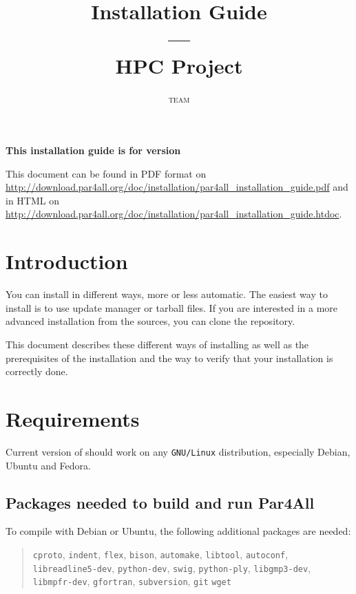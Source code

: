 \documentclass[a4paper]{article}
\newcommand{\LINK}[1]{\url{#1}\xspace}
\newcommand{\PfaInstallationPDF}{\LINK{http://download.par4all.org/doc/installation/par4all_installation_guide.pdf}}
\newcommand{\PfaAllInstallationHTDOC}{\LINK{http://download.par4all.org/doc/installation/par4all_installation_guide.htdoc}}
\begin{document}
\title{\protect\Apfa Installation Guide\\
  ---\\
  HPC Project}

\author{\Apfa \textsc{team}}

\maketitle

\noindent\textbf{This installation guide is for \Apfa version }
\bigskip

This document can be found in PDF format on \PfaInstallationPDF and in HTML
on \PfaAllInstallationHTDOC.


\section{Introduction}
\label{sec:introduction}


You can install \Apfa in different ways, more or less automatic. The easiest
way to install \Apfa is to use update manager or tarball files. If you are
interested in a more advanced installation from the sources, you can clone 
the \Apfa \Agit repository.

This document describes these different ways of installing \Apfa as well as 
the prerequisites of the installation and the way to verify that your installation
is correctly done.

\section{Requirements}
\label{sec:requirements}

Current version of \Apfa should work on any \texttt{GNU/Linux} distribution, especially Debian, 
Ubuntu and Fedora.

\subsection{Packages needed to build and run Par4All}
\label{sec:pack-need-build}


To compile \Apfa with Debian or Ubuntu, the following additional
packages are needed:
\begin{quote}
  \texttt{cproto}, \texttt{indent}, \texttt{flex}, \texttt{bison},
  \texttt{automake}, \texttt{libtool}, \texttt{autoconf},
  \texttt{libreadline5-dev}, \texttt{python-dev}, \texttt{swig},
  \texttt{python-ply}, \texttt{libgmp3-dev},
  \texttt{libmpfr-dev}, \texttt{gfortran}, \texttt{subversion},
  \texttt{git} \texttt{wget}
\end{quote}
\end{document}
